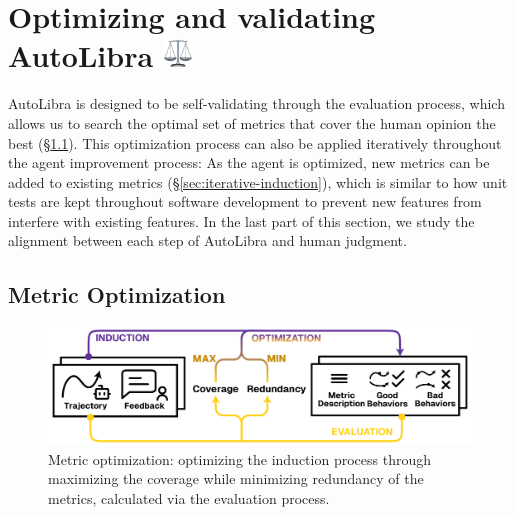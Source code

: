 \section{Optimizing and validating AutoLibra \protect\includegraphics[height=1em]{figs/scale.png}}
AutoLibra is designed to be self-validating through the evaluation process, which allows us to search the optimal set of metrics that cover the human opinion the best (\S\ref{sec:metric-optimization}). 
This optimization process can also be applied iteratively throughout the agent improvement process: As the agent is optimized, new metrics can be added to existing metrics (\S\ref{sec:iterative-induction}), which is similar to how unit tests are kept throughout software development to prevent new features from interfere with existing features. 
In the last part of this section, we study the alignment between each step of AutoLibra and human judgment. 


\subsection{Metric Optimization}
\label{sec:metric-optimization}

\begin{figure}[!t]
    \centering
    \includegraphics[width=0.8\linewidth]{figs/autolibra_optimization.pdf}
    \caption{Metric optimization: optimizing the induction process through maximizing the coverage while minimizing redundancy of the metrics, calculated via the evaluation process.}
    \label{fig:autolibra_optimization}
\end{figure}


